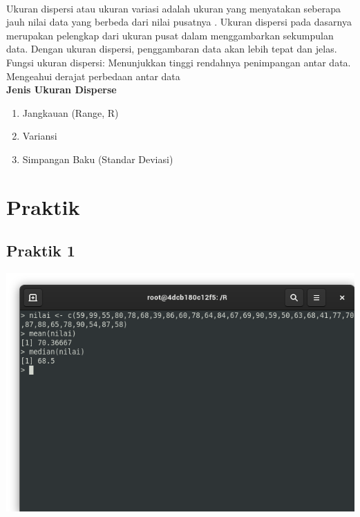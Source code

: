 \documentclass[a4paper,12pt]{article}
\begin{document}
\begin{enumerate}[label={\bfseries \Alph*.}]
	\paragraph{}
	Ukuran  dispersi  atau  ukuran  variasi  adalah  ukuran  yang  menyatakan  seberapa  jauh nilai data  yang  berbeda  dari  nilai  pusatnya . Ukuran  dispersi  pada   dasarnya  merupakan  pelengkap  dari  ukuran  pusat  dalam menggambarkan  sekumpulan  data.  Dengan  ukuran  dispersi,  penggambaran  data  akan  lebih tepat dan jelas.
	Fungsi ukuran dispersi:
	Menunjukkan tinggi rendahnya penimpangan antar data.
	Mengeahui derajat perbedaan antar data\\
	{\bfseries Jenis Ukuran Disperse}
	\begin{enumerate}
		\item Jangkauan (Range, R)
		\item Variansi
		\item Simpangan Baku (Standar Deviasi) 
	\end{enumerate}
	
\end{enumerate}

\section{Praktik}
\subsection{Praktik 1}
\begin{center}
\includegraphics[scale=.6]{praktik01}
\end{center}
\end{document}
